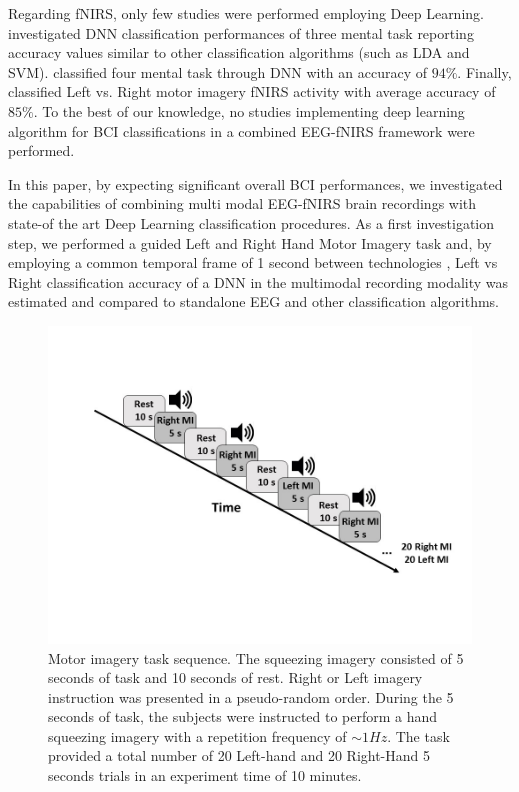 \documentclass[12pt ]{iopart}
\begin{document}
Regarding fNIRS, only  few  studies were performed employing Deep Learning.  \textcite{hennrich2015investigating} investigated DNN classification performances of three mental task reporting accuracy values similar  to other classification algorithms (such as LDA and SVM).  \textcite{abibullaev2011neural} classified four mental task through DNN with an accuracy of $94\%$. Finally, \textcite{nguyen2013temporal} classified Left vs. Right motor imagery fNIRS activity with average accuracy of $85\%$. To the best of our knowledge, no studies implementing deep learning algorithm for BCI classifications  in a combined EEG-fNIRS framework were performed.

In this paper, by expecting significant overall BCI performances,  we investigated the capabilities of combining multi modal EEG-fNIRS brain recordings  with state-of the art Deep Learning classification procedures. As a first investigation step, we performed a guided Left and Right Hand Motor Imagery task \parencite{pfurtscheller1997motor} and, by employing a common temporal frame of 1 second between technologies \parencite{govindan2016novel}, Left vs Right classification accuracy of a DNN in the multimodal recording modality was estimated and compared to standalone EEG and other classification algorithms. 

\begin{figure}
	\includegraphics[width=\linewidth]{Slide1.JPG}
	\caption{ Motor imagery task sequence. The 
		squeezing imagery consisted of 5 seconds of task and 10 seconds of rest. Right or Left imagery instruction was presented in a pseudo-random order.  During the 5 seconds of task, the subjects were instructed to perform a hand squeezing imagery with a repetition frequency of $\sim1Hz$. The task provided a total number of 20 Left-hand and 20 Right-Hand 5 seconds trials in an experiment time of 10 minutes. }
	\label{fig:fig1}
\end{figure}
\end{document}
